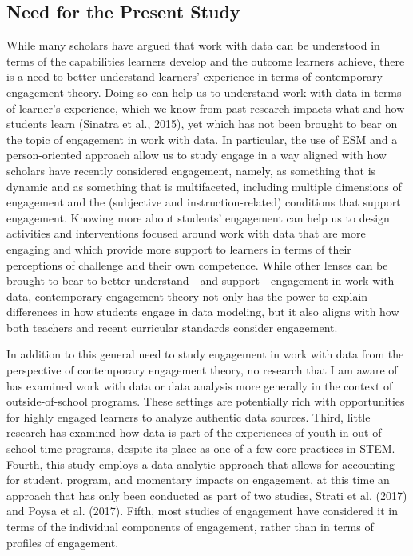 \documentclass[]{msu-thesis}
\theoremstyle{definition}
\theoremstyle{definition}
\theoremstyle{definition}
\theoremstyle{remark}
\begin{document}
\subsection{Need for the Present
Study}\label{need-for-the-present-study}

While many scholars have argued that work with data can be understood in
terms of the capabilities learners develop and the outcome learners
achieve, there is a need to better understand learners' experience in
terms of contemporary engagement theory. Doing so can help us to
understand work with data in terms of learner's experience, which we
know from past research impacts what and how students learn (Sinatra et
al., 2015), yet which has not been brought to bear on the topic of
engagement in work with data. In particular, the use of ESM and a
person-oriented approach allow us to study engage in a way aligned with
how scholars have recently considered engagement, namely, as something
that is dynamic and as something that is multifaceted, including
multiple dimensions of engagement and the (subjective and
instruction-related) conditions that support engagement. Knowing more
about students' engagement can help us to design activities and
interventions focused around work with data that are more engaging and
which provide more support to learners in terms of their perceptions of
challenge and their own competence. While other lenses can be brought to
bear to better understand---and support---engagement in work with data,
contemporary engagement theory not only has the power to explain
differences in how students engage in data modeling, but it also aligns
with how both teachers and recent curricular standards consider
engagement.

In addition to this general need to study engagement in work with data
from the perspective of contemporary engagement theory, no research that
I am aware of has examined work with data or data analysis more
generally in the context of outside-of-school programs. These settings
are potentially rich with opportunities for highly engaged learners to
analyze authentic data sources. Third, little research has examined how
data is part of the experiences of youth in out-of-school-time programs,
despite its place as one of a few core practices in STEM. Fourth, this
study employs a data analytic approach that allows for accounting for
student, program, and momentary impacts on engagement, at this time an
approach that has only been conducted as part of two studies, Strati et
al. (2017) and Poysa et al. (2017). Fifth, most studies of engagement
have considered it in terms of the individual components of engagement,
rather than in terms of profiles of engagement.
\end{document}
